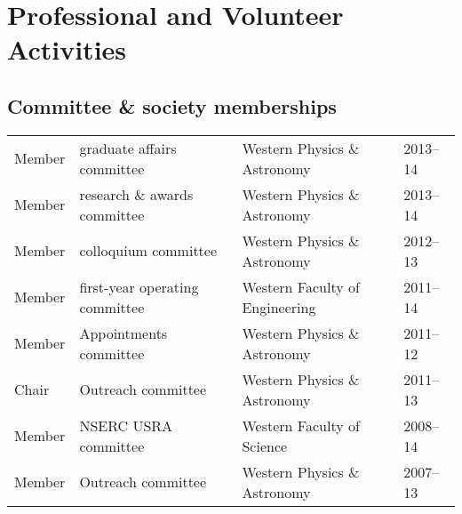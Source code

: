 \documentclass[12pt]{article}
\begin{document}
\section{Professional and Volunteer Activities}

\subsection{Committee \& society memberships}
\begin{tabular}{p{1.5cm}lll}
Member& graduate affairs committee&  Western Physics \& Astronomy& 2013--14\\
Member& research \& awards committee&  Western Physics \& Astronomy& 2013--14\\
Member& colloquium committee& Western Physics \& Astronomy& 2012--13\\
Member& first-year operating committee& Western Faculty of Engineering &  2011--14\\
Member & Appointments committee& Western Physics \& Astronomy& 2011--12\\
Chair& Outreach committee& Western Physics \& Astronomy& 2011--13\\
Member&  NSERC USRA committee& Western Faculty of Science& 2008--14\\
Member&  Outreach committee& Western Physics \& Astronomy& 2007--13\\
\end{tabular}
\end{document}
